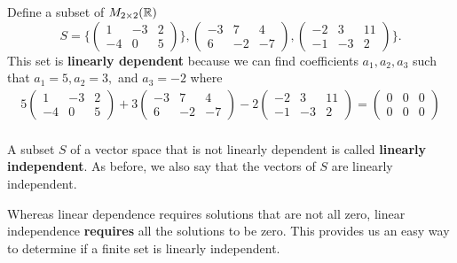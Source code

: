 \begin{eg}
    Define a subset of \( M_{2 \times 2}(\mathbb{R}) \)
    \[ S = \Bigg\{ \begin{pmatrix}
            1 & - 3 & 2 \\
            -4 & 0 & 5 
    \end{pmatrix} \}, \begin{pmatrix}
            - 3 & 7 & 4 \\
            6 & -2 & -7
    \end{pmatrix}, \begin{pmatrix}
            -2 & 3 & 11 \\
            -1 & -3 & 2 
    \end{pmatrix}  \Bigg\}.  \]
    This set is \textbf{linearly dependent} because we can find coefficients \( a_{1} , a_{2}, a_{3}  \) such that \( a_{1} = 5 , a_{2} = 3 ,  \) and \( a_{3} = - 2  \) where 
    \begin{align*}
        5 \begin{pmatrix}
            1 & -3 & 2 \\
            -4 & 0 & 5 
        \end{pmatrix} + 3 \begin{pmatrix}
            -3 & 7 & 4 \\
            6 & -2 & -7
        \end{pmatrix} - 2 \begin{pmatrix}
            -2 & 3 & 11 \\
            -1 & -3 & 2 
        \end{pmatrix} = \begin{pmatrix}
            0 & 0 & 0 \\
            0 & 0 & 0 
        \end{pmatrix}  \\
    \end{align*}
\end{eg}

\begin{definition}
   A subset \( S  \) of a vector space that is not linearly dependent is called \textbf{linearly independent}. As before, we also say that the vectors of \( S  \) are linearly independent. 
\end{definition}

Whereas linear dependence requires solutions that are not all zero, linear independence \textbf{requires} all the solutions to be zero. This provides us an easy way to determine if a finite set is linearly independent.

